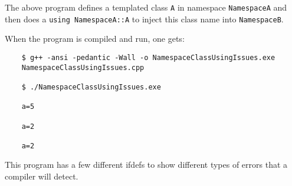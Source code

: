 The above program defines a templated class {}\texttt{A} in namespace
{}\texttt{NamespaceA} and then does a {}\texttt{using NamespaceA::A} to inject
this class name into {}\texttt{NamespaceB}.

When the program is compiled and run, one gets:

{\small\begin{verbatim}
    $ g++ -ansi -pedantic -Wall -o NamespaceClassUsingIssues.exe
    NamespaceClassUsingIssues.cpp
    
    $ ./NamespaceClassUsingIssues.exe 
    
    a=5
    
    a=2
    
    a=2
\end{verbatim}}

This program has a few different ifdefs to show different types of errors that
a compiler will detect.

